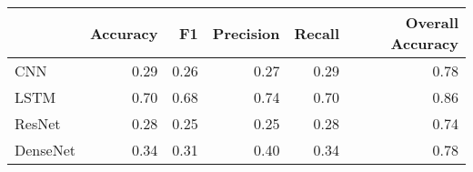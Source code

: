 \begin{tabular}{lrrrrr}
\toprule
{} &  Accuracy &    F1 &  Precision &  Recall &  Overall Accuracy \\
\midrule
CNN      &      0.29 &  0.26 &       0.27 &    0.29 &              0.78 \\
LSTM     &      0.70 &  0.68 &       0.74 &    0.70 &              0.86 \\
ResNet   &      0.28 &  0.25 &       0.25 &    0.28 &              0.74 \\
DenseNet &      0.34 &  0.31 &       0.40 &    0.34 &              0.78 \\
\bottomrule
\end{tabular}
